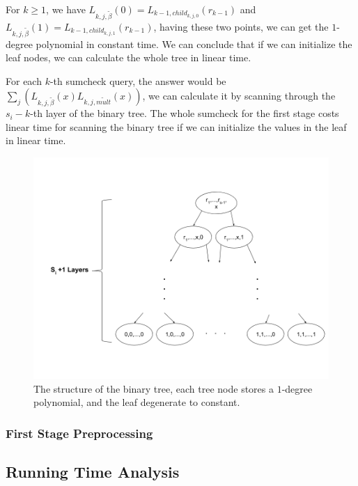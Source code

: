 For $k \ge 1$, we have $L_{k, j, \tilde{\beta}}(0)=L_{k-1, child_{k, j, 0}}(r_{k-1})$ and $L_{k, j, \tilde{\beta}}(1)=L_{k-1, child_{k, j, 1}}(r_{k-1})$, having these two points, we can get the $1$-degree polynomial in constant time. We can conclude that if we can initialize the leaf nodes, we can calculate the whole tree in linear time.

For each $k$-th sumcheck query, the answer would be $\sum_{j}(L_{k, j, \tilde{\beta}}(x)L_{k, j, \tilde{mult}}(x))$, we can calculate it by scanning through the $s_i-k$-th layer of the binary tree. The whole sumcheck for the first stage costs linear time for scanning the binary tree if we can initialize the values in the leaf in linear time.

\begin{figure}
\label{fig::bin_structure}
\includegraphics[width=15cm]{structurebintree.png}
\caption{The structure of the binary tree, each tree node stores a $1$-degree polynomial, and the leaf degenerate to constant.}
\end{figure}

\subsubsection{First Stage Preprocessing}

\subsection{Running Time Analysis}